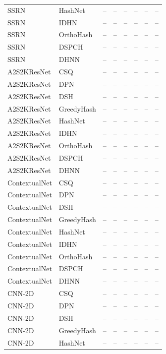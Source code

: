 \begin{longtable}{llrrrrrr}
SSRN & HashNet & -- & -- & -- & -- & -- & -- \\
SSRN & IDHN & -- & -- & -- & -- & -- & -- \\
SSRN & OrthoHash & -- & -- & -- & -- & -- & -- \\
SSRN & DSPCH & -- & -- & -- & -- & -- & -- \\
SSRN & DHNN & -- & -- & -- & -- & -- & -- \\
\addlinespace
A2S2KResNet & CSQ & -- & -- & -- & -- & -- & -- \\
A2S2KResNet & DPN & -- & -- & -- & -- & -- & -- \\
A2S2KResNet & DSH & -- & -- & -- & -- & -- & -- \\
A2S2KResNet & GreedyHash & -- & -- & -- & -- & -- & -- \\
A2S2KResNet & HashNet & -- & -- & -- & -- & -- & -- \\
A2S2KResNet & IDHN & -- & -- & -- & -- & -- & -- \\
A2S2KResNet & OrthoHash & -- & -- & -- & -- & -- & -- \\
A2S2KResNet & DSPCH & -- & -- & -- & -- & -- & -- \\
A2S2KResNet & DHNN & -- & -- & -- & -- & -- & -- \\
\addlinespace
ContextualNet & CSQ & -- & -- & -- & -- & -- & -- \\
ContextualNet & DPN & -- & -- & -- & -- & -- & -- \\
ContextualNet & DSH & -- & -- & -- & -- & -- & -- \\
ContextualNet & GreedyHash & -- & -- & -- & -- & -- & -- \\
ContextualNet & HashNet & -- & -- & -- & -- & -- & -- \\
ContextualNet & IDHN & -- & -- & -- & -- & -- & -- \\
ContextualNet & OrthoHash & -- & -- & -- & -- & -- & -- \\
ContextualNet & DSPCH & -- & -- & -- & -- & -- & -- \\
ContextualNet & DHNN & -- & -- & -- & -- & -- & -- \\
\addlinespace
CNN-2D & CSQ & -- & -- & -- & -- & -- & -- \\
CNN-2D & DPN & -- & -- & -- & -- & -- & -- \\
CNN-2D & DSH & -- & -- & -- & -- & -- & -- \\
CNN-2D & GreedyHash & -- & -- & -- & -- & -- & -- \\
CNN-2D & HashNet & -- & -- & -- & -- & -- & -- \\

\end{longtable}
